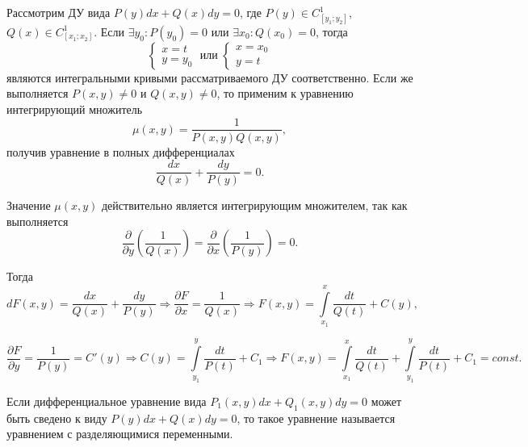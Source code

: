     Рассмотрим ДУ вида $P(y)dx + Q(x)dy = 0$, где $P(y) \in C_{[y_1; y_2]}^1$, $Q(x) \in C_{[x_1; x_2]}^1$. Если $\exists y_0: P(y_0) = 0$ или  $\exists x_0: Q(x_0) = 0$, тогда
    \begin{equation}
        \begin{cases}
            x = t \\ 
            y = y_0
        \end{cases} \;
        \text{или} \;
        \begin{cases}
            x = x_0 \\ 
            y = t
        \end{cases}
    \end{equation}
    являются интегральными кривыми рассматриваемого ДУ соответственно. Если же выполняется $P(x, y) \neq 0$ и $Q(x, y) \neq 0$, то применим к уравнению интегрирующий множитель
    \[ \mu(x, y) = \frac{1}{P(x, y)Q(x, y)}, \]
    получив уравнение в полных дифференциалах
    \begin{equation*}
        \frac{dx}{Q(x)} + \frac{dy}{P(y)} = 0.
    \end{equation*}

    Значение $\mu(x, y)$ действительно является интегрирующим множителем, так как выполняется
    \begin{equation*}
        \frac{\partial}{\partial y} \left( \frac{1}{Q(x)} \right) =  \frac{\partial}{\partial x} \left( \frac{1}{P(y)} \right) = 0.
    \end{equation*}

    Тогда
    \begin{equation*}
        dF(x, y) = \frac{dx}{Q(x)} + \frac{dy}{P(y)} \Rightarrow \frac{\partial F}{\partial x} = \frac{1}{Q(x)} \Rightarrow F(x, y) = \int\limits_{x_1}^{x} \frac{dt}{Q(t)} + C(y),
    \end{equation*}

    \begin{equation*}
        \frac{\partial F}{\partial y} = \frac{1}{P(y)} = C'(y) \Rightarrow C(y) = \int\limits_{y_1}^{y} \frac{dt}{P(t)} + C_1 \Rightarrow F(x, y) = \int\limits_{x_1}^{x} \frac{dt}{Q(t)} + \int\limits_{y_1}^{y} \frac{dt}{P(t)} + C_1 = const.
    \end{equation*}

    \begin{definition}
        Если дифференциальное уравнение вида $P_1(x, y)dx + Q_1(x, y)dy = 0$ может быть сведено к виду $P(y)dx + Q(x)dy = 0$, то такое уравнение называется уравнением с разделяющимися переменными.
    \end{definition}

